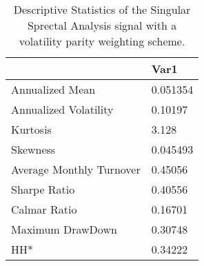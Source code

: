 \begin{table}[H]
\centering
\begin{tabular}{ll}
\hline& Var1 \\ 
\hline 
Annualized Mean & 0.051354 \\ 
Annualized Volatility & 0.10197 \\ 
Kurtosis & 3.128 \\ 
Skewness & 0.045493 \\ 
Average Monthly Turnover & 0.45056 \\ 
Sharpe Ratio & 0.40556 \\ 
Calmar Ratio & 0.16701 \\ 
Maximum DrawDown & 0.30748 \\ 
HH* & 0.34222 \\ 
\hline
\end{tabular}
\caption{Descriptive Statistics of the Singular Sprectal Analysis signal with a volatility parity weighting scheme.}
\label{SSA}
\end{table}